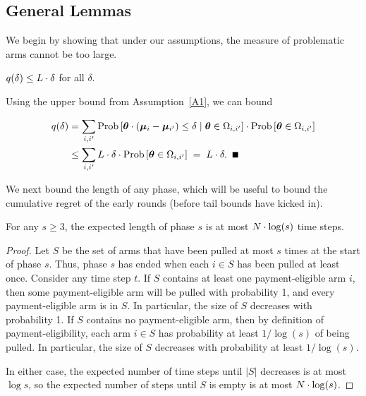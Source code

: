 \subsection{General Lemmas}

We begin by showing that under our assumptions, the measure of
problematic arms cannot be too large.

\begin{lemma} \label{lem:sdelta}
$q(\delta) \leq L \cdot \delta$ for all $\delta$.
\end{lemma}

\begin{emptyproof}
Using the upper bound from Assumption~\ref{A1}, we can bound

\begin{align*}
\AlmostTied{\delta}
& = \sum_{i,i'} \ProbC{\AgV \cdot (\ArmV{i} - \ArmV{i'}) \leq \delta}%
    {\AgV \in \FirstTwo{i}{i'}}
  \cdot \Prob{\AgV \in \FirstTwo{i}{i'}}\\
& \leq \sum_{i,i'} \TieDensity \cdot \delta
    \cdot \Prob{\AgV \in \FirstTwo{i}{i'}}
\; = \; \TieDensity \cdot \delta. \QED
\end{align*}
\end{emptyproof}

We next bound the length of any phase, which will be useful to bound
the cumulative regret of the early rounds
(before tail bounds have kicked in).

\begin{lemma} \label{lem:phase-length}
For any $s\geq 3$, the expected length of phase $s$ is at most
$N \cdot \log(s)$ time steps.
\end{lemma}

\begin{proof}
Let $S$ be the set of arms that have been pulled at most
$s$ times at the start of phase $s$.
Thus, phase $s$ has ended when each $i \in S$ has been pulled at least once.
Consider any time step $t$.
If $S$ contains at least one payment-eligible arm $i$,
then some payment-eligible arm will be pulled with probability 1,
and every payment-eligible arm is in $S$.
In particular, the size of $S$ decreases with probability 1.
If $S$ contains no payment-eligible arm,
then by definition of payment-eligibility,
each arm $i \in S$ has probability at least $1/\log(s)$ of being pulled.
In particular, the size of $S$ decreases with probability at least $1/\log(s)$.

In either case, the expected number of time steps until
$|S|$ decreases is at most $\log s$,
so the expected number of steps until $S$ is empty is at most
$N \cdot \log(s)$.
\end{proof}
                  
